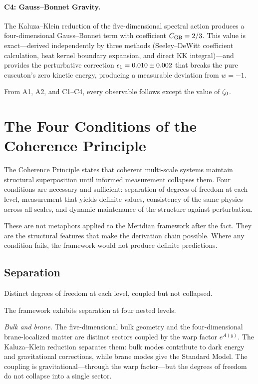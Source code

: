 \paragraph{C4: Gauss--Bonnet Gravity.}
The Kaluza--Klein reduction of the five-dimensional spectral action
produces a four-dimensional Gauss--Bonnet term with coefficient
$C_{\mathrm{GB}} = 2/3$. This value is exact---derived independently by three
methods (Seeley--DeWitt coefficient calculation, heat kernel boundary
expansion, and direct KK integral)---and provides the perturbative
correction $\epsilon_1 = 0.010 \pm 0.002$ that breaks the pure cuscuton's
zero kinetic energy, producing a measurable deviation from $w = -1$.

From A1, A2, and C1--C4, every observable follows except the value of
$\zeta_0$.

\section{The Four Conditions of the Coherence Principle}
\label{sec:0-coherence}

The Coherence Principle states that coherent multi-scale systems
maintain structural superposition until informed measurement collapses
them. Four conditions are necessary and sufficient: separation of
degrees of freedom at each level, measurement that yields definite
values, consistency of the same physics across all scales, and dynamic
maintenance of the structure against perturbation.

These are not metaphors applied to the Meridian framework after the
fact. They are the structural features that make the derivation chain
possible. Where any condition fails, the framework would not produce
definite predictions.

\subsection{Separation}
\label{sec:0-separation}

Distinct degrees of freedom at each level, coupled but not collapsed.

The framework exhibits separation at four nested levels.

\textit{Bulk and brane.} The five-dimensional bulk geometry and the
four-dimensional brane-localized matter are distinct sectors coupled
by the warp factor $e^{A(y)}$. The Kaluza--Klein reduction separates
them: bulk modes contribute to dark energy and gravitational
corrections, while brane modes give the Standard Model. The coupling
is gravitational---through the warp factor---but the degrees of
freedom do not collapse into a single sector.

